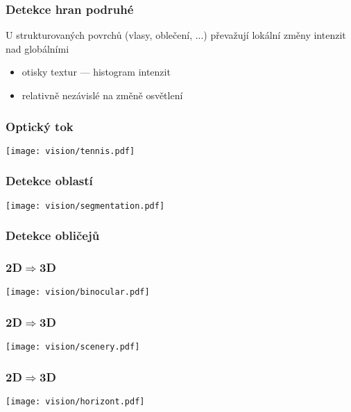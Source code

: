 \documentclass[red,handout,professionalfont]{beamer}
\theoremstyle{definition}
\newcommand{\0}{\mbox{${\bf 0}$}}
\begin{document}
\begin{frame}\frametitle{Detekce hran podruhé}
\begin{center}
 U strukturovaných povrchů (vlasy, oblečení, ...) převažují lokální změny intenzit
 nad globálními
\end{center}\pause
\begin{itemize}
 \item otisky textur --- histogram intenzit
 \item relativně nezávislé na změně osvětlení
\end{itemize}\pause
\end{frame}

\begin{frame}\frametitle{Optický tok}
\begin{center}
 \texttt{[image: vision/tennis.pdf]}
\end{center}
\end{frame}

\begin{frame}\frametitle{Detekce oblastí}
\begin{center}
 \texttt{[image: vision/segmentation.pdf]}
\end{center}
\end{frame}

\begin{frame}\frametitle{Detekce obličejů}
\end{frame}

\begin{frame}\frametitle{2D$\Rightarrow$3D}
\begin{center}
\texttt{[image: vision/binocular.pdf]}
\end{center}
\end{frame}


\begin{frame}\frametitle{2D$\Rightarrow$3D}
\begin{center}
\texttt{[image: vision/scenery.pdf]}
\end{center}
\end{frame}

\begin{frame}\frametitle{2D$\Rightarrow$3D}
\begin{center}
\texttt{[image: vision/horizont.pdf]}
\end{center}
\end{frame}
\end{document}
